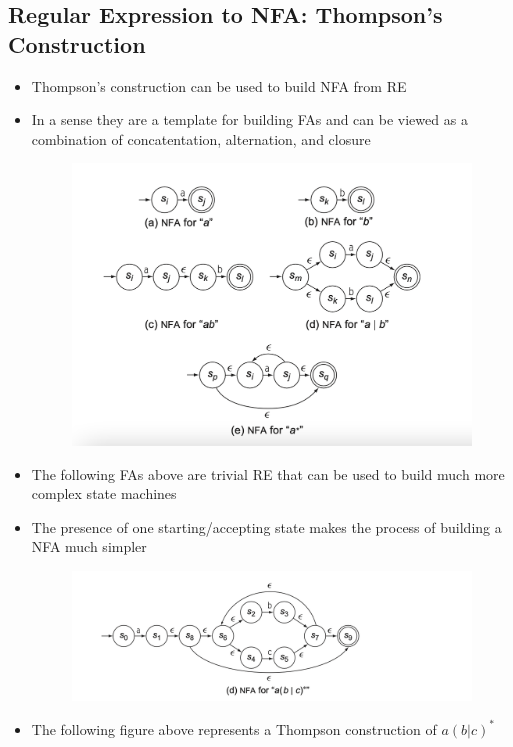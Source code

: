 \documentclass[20pt]{article}
\begin{document}
            \subsection*{Regular Expression to NFA: Thompson's Construction}
                        \begin{itemize}
                            \item Thompson's construction can be used to build NFA from RE
                            \item In a sense they are a template for building FAs and can be viewed as a combination of concatentation, alternation, and closure
                            \begin{figure}[h]
                                \includegraphics[width=\textwidth]{Images/thompson.png}
                            \end{figure}
                            \item The following FAs above are trivial RE that can be used to build much more complex state machines
                            \item The presence of one starting/accepting state makes the process of building a NFA much simpler 
                            \begin{figure}[h]
                                \includegraphics*[width=\textwidth]{Images/example.png}
                            \end{figure}
                            \item The following figure above represents a Thompson construction of $a(b|c)^*$
                        \end{itemize}
\end{document}
